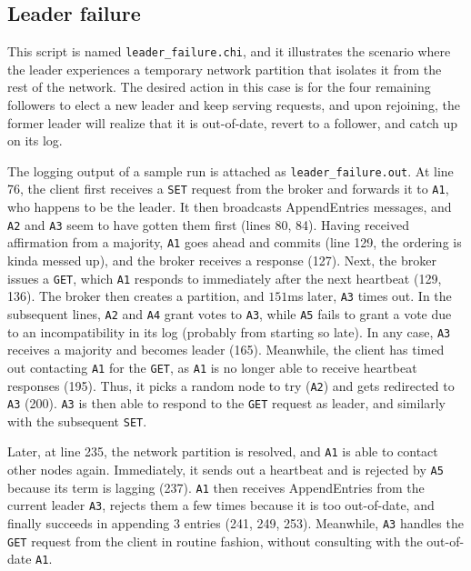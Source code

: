\documentclass[psamsfonts]{amsart}
\begin{document}
\subsection{Leader failure}
This script is named \verb|leader_failure.chi|, and it illustrates the scenario where the leader experiences a temporary network partition that isolates it from the rest of the network. The desired action in this case is for the four remaining followers to elect a new leader and keep serving requests, and upon rejoining, the former leader will realize that it is out-of-date, revert to a follower, and catch up on its log.

The logging output of a sample run is attached as \verb|leader_failure.out|. At line 76, the client first receives a \verb|SET| request from the broker and forwards it to \verb|A1|, who happens to be the leader. It then broadcasts AppendEntries messages, and \verb|A2| and \verb|A3| seem to have gotten them first (lines 80, 84). Having received affirmation from a majority, \verb|A1| goes ahead and commits (line 129, the ordering is kinda messed up), and the broker receives a response (127). Next, the broker issues a \verb|GET|, which \verb|A1| responds to immediately after the next heartbeat (129, 136). The broker then creates a partition, and $151$ms later, \verb|A3| times out. In the subsequent lines, \verb|A2| and \verb|A4| grant votes to \verb|A3|, while \verb|A5| fails to grant a vote due to an incompatibility in its log (probably from starting so late). In any case, \verb|A3| receives a majority and becomes leader (165). Meanwhile, the client has timed out contacting \verb|A1| for the \verb|GET|, as \verb|A1| is no longer able to receive heartbeat responses (195). Thus, it picks a random node to try (\verb|A2|) and gets redirected to \verb|A3| (200). \verb|A3| is then able to respond to the \verb|GET| request as leader, and similarly with the subsequent \verb|SET|. 

Later, at line 235, the network partition is resolved, and \verb|A1| is able to contact other nodes again. Immediately, it sends out a heartbeat and is rejected by \verb|A5| because its term is lagging (237). \verb|A1| then receives AppendEntries from the current leader \verb|A3|, rejects them a few times because it is too out-of-date, and finally succeeds in appending 3 entries (241, 249, 253). Meanwhile, \verb|A3| handles the \verb|GET| request from the client in routine fashion, without consulting with the out-of-date \verb|A1|.
\end{document}
